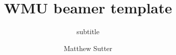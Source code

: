 \documentclass{beamer}
\title{WMU beamer template}
\subtitle{subtitle}
\author{Matthew Sutter}
\date{}
\begin{document}
\begin{frame}
    \titlepage
\end{frame}
\end{document}
